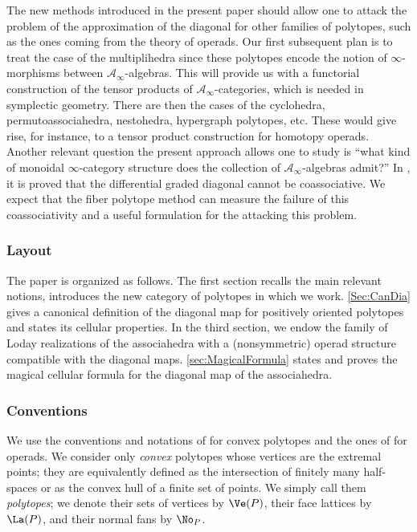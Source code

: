 The new methods introduced in the present paper should allow one to attack the problem of the approximation of the diagonal for other families of polytopes, such as the ones coming from the theory of operads.
Our first subsequent plan
is to treat the case of the multiplihedra \cite{Stasheff70} since these polytopes encode the notion of $\infty$-morphisms between $\mathcal{A}_\infty$-algebras. This will provide us with a functorial construction of the tensor products of $\mathcal{A}_\infty$-categories, which is needed in symplectic geometry.
There are then the cases of the cyclohedra, permutoassociahedra, nestohedra, hypergraph polytopes, etc. These would give rise, for instance, to a tensor product construction for homotopy operads. Another relevant question the present approach allows one to study is ``what kind of monoidal $\infty$-category structure does the collection of $\mathcal{A}_\infty$-algebras admit?''
In \cite{MarklShnider06}, it is proved that the differential graded diagonal cannot be coassociative. We expect that the fiber polytope method can measure the failure of this coassociativity and a useful formulation for the attacking this problem.

\subsubsection*{Layout}
The paper is organized as follows. The first section recalls the main relevant notions, introduces the new category of polytopes in which we work. \cref{Sec:CanDia} gives a canonical definition of the diagonal map for positively oriented polytopes and states its cellular properties. In the third section, we endow the family of Loday realizations of the associahedra with a (nonsymmetric) operad structure compatible with the diagonal maps. \cref{sec:MagicalFormula} states and proves the magical cellular formula for the diagonal map of the associahedra.

\subsubsection*{Conventions} We use the conventions and notations of \cite{Ziegler95} for convex polytopes and the ones of \cite{LodayVallette12} for operads. We consider only \emph{convex} polytopes whose vertices are the extremal points; they are equivalently defined as the intersection of finitely many half-spaces or as the convex hull of a finite set of points. We simply call them \emph{polytopes}; we denote their sets of vertices by $\Ve(P)$, their face lattices by $\La(P)$, and their normal fans by $\No_P$.

